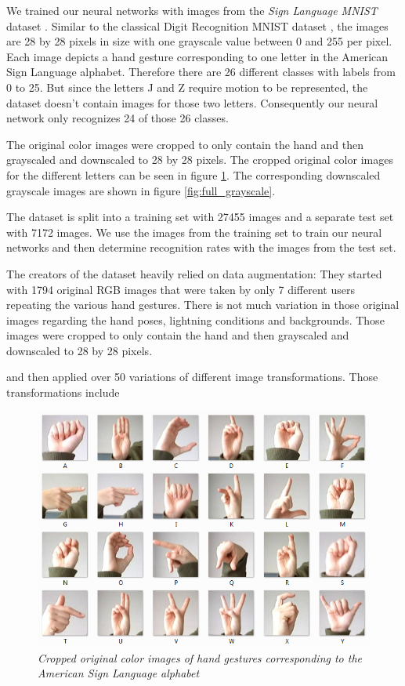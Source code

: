 \documentclass[a4paper]{article}
\begin{document}
We trained our neural networks with images from the \textit{Sign Language MNIST} dataset \cite{DatasetKaggle}. Similar to the classical Digit Recognition MNIST dataset \cite{MNIST}, the images are 28 by 28 pixels in size with one grayscale value between 0 and 255 per pixel. Each image depicts a hand gesture corresponding to one letter in the American Sign Language alphabet. Therefore there are 26 different classes with labels from 0 to 25. But since the letters J and Z require motion to be represented, the dataset doesn't contain images for those two letters. Consequently our neural network only recognizes 24 of those 26 classes.

The original color images were cropped to only contain the hand and then grayscaled and downscaled to 28 by 28 pixels. The cropped original color images for the different letters can be seen in figure \ref{fig:full_colored}. The corresponding downscaled grayscale images are shown in figure \ref{fig:full_grayscale}.

The dataset is split into a training set with 27455 images and a separate test set with 7172 images. We use the images from the training set to train our neural networks and then determine recognition rates with the images from the test set.

The creators of the dataset heavily relied on data augmentation: They started with 1794 original RGB images that were taken by only 7 different users repeating the various hand gestures. There is not much variation in those original images regarding the hand poses, lightning conditions and backgrounds. Those images were cropped to only contain the hand and then grayscaled and downscaled to 28 by 28 pixels.

and then applied over 50 variations of different image transformations. Those transformations include 






\begin{figure}
     \centering
     \includegraphics[width=1\linewidth]{graphics/dataset/amer_sign2.png}
     \caption{\textit{Cropped original color images of hand gestures corresponding to the American Sign Language alphabet \cite{DatasetKaggle}}}
     \label{fig:full_colored}
\end{figure}
\end{document}

